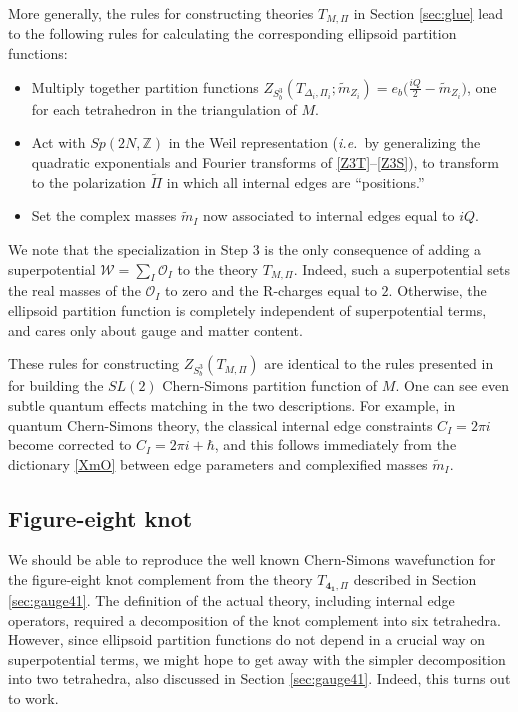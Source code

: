 \documentclass[hyper,letterpaper]{JHEP3}
\numberwithin{equation}{section}
\newcommand{\mb}{\mathbf}
\newcommand{\ie}{\emph{i.e.}}
\newcommand{\Z}{{\mathbb Z}}
\newcommand{\CO}{\mathcal{O}}
\newcommand{\CW}{\mathcal{W}}
\begin{document}
More generally, the rules for constructing theories $T_{M,\Pi}$ in Section \ref{sec:glue} lead to the following rules for calculating the corresponding ellipsoid partition functions:
%
\begin{itemize}
\item[1)] Multiply together partition functions $Z_{S^3_b}(T_{\Delta_i,\Pi_i};\tilde m_{Z_i}) = e_b\big(\tfrac{iQ}{2}-\tilde m_{Z_i}\big)$, one for each tetrahedron in the triangulation of $M$.
\item[2)] Act with $Sp(2N,\Z)$ in the Weil representation (\ie\ by generalizing the quadratic exponentials and Fourier transforms of \eqref{Z3T}--\eqref{Z3S}), to transform to the polarization $\tilde\Pi$ in which all internal edges are ``positions.''
\item[3)] Set the complex masses $\tilde m_I$ now associated to internal edges equal to $iQ$.
\end{itemize}
%
We note that the specialization in Step 3 is the only consequence of adding a superpotential $\CW = \sum_I \CO_I$ to the theory $T_{M,\Pi}$. Indeed, such a superpotential sets the real masses of the $\CO_I$ to zero and the R-charges equal to $2$. Otherwise, the ellipsoid partition function is completely independent of superpotential terms, and cares only about gauge and matter content.

These rules for constructing $Z_{S^3_b}(T_{M,\Pi})$ are identical to the rules presented in \cite{Dimofte-QRS} for building the $SL(2)$ Chern-Simons partition function of $M$. One can see even subtle quantum effects matching in the two descriptions. For example, in quantum Chern-Simons theory, the classical internal edge constraints $C_I = 2\pi i$ become corrected to $C_I = 2\pi i+\hbar$, and this follows immediately from the dictionary \eqref{XmO} between edge parameters and complexified masses $\tilde m_I$.




\subsection{Figure-eight knot}



We should be able to reproduce the well known Chern-Simons wavefunction for the figure-eight knot complement from the theory $T_{\mb{4_1},\Pi}$ described in Section \ref{sec:gauge41}. The definition of the actual theory, including internal edge operators, required a decomposition of the knot complement into six tetrahedra. However, since ellipsoid partition functions do not depend in a crucial way on superpotential terms, we might hope to get away with the simpler decomposition into two tetrahedra, also discussed in Section \ref{sec:gauge41}. Indeed, this turns out to work.
\end{document}
